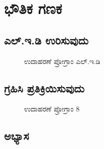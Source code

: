 
\chapter{ಭೌತಿಕ ಗಣಕ}

\section{ಎಲ್.ಇ.ಡಿ ಉರಿಸುವುದು}
\begin{figure}[h]
\caption{ಉದಾಹರಣೆ ಪ್ರೋಗ್ರಾಂ ಎಲ್.ಇ.ಡಿ}
\end{figure}

\section{ಗ್ರಹಿಸಿ ಪ್ರತಿಕ್ರಿಯಿಸುವುದು} 
\begin{figure}[h]
\begin{Scratch}[1]
\beginbox{}
\end{Scratch}
\caption{ಉದಾಹರಣೆ ಪ್ರೋಗ್ರಾಂ 8}
\end{figure}

\section{ಅಭ್ಯಾಸ }
